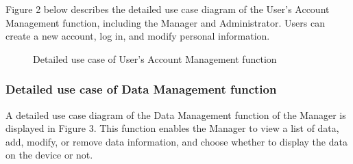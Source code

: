 \documentclass[../Main.tex]{subfiles}
\begin{document}
Figure 2 below describes the detailed use case diagram of the User's Account Management function, including the Manager and Administrator. Users can create a new account, log in, and modify personal information.

\begin{figure}[htbp]
    \centering
    \caption{Detailed use case of User's Account Management function}
    \label{fig:usecasediagram}
\end{figure}

\subsubsection{Detailed use case of Data Management function}
A detailed use case diagram of the Data Management function of the Manager is displayed in Figure 3. This function enables the Manager to view a list of data, add, modify, or remove data information, and choose whether to display the data on the device or not.
\end{document}
